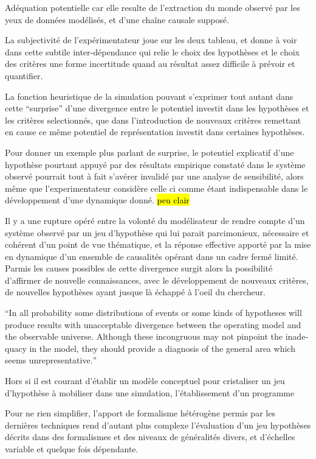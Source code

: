 Adéquation potentielle car elle resulte de l'extraction du monde observé par les yeux de données modélisés, et d'une chaîne causale supposé. 


La subjectivité de l'expérimentateur joue sur les deux tableau, et donne à voir dans cette subtile inter-dépendance qui relie le choix des hypothèses et le choix des critères une forme incertitude quand au résultat assez difficile à prévoir et quantifier.

La fonction heuristique de la simulation pouvant s'exprimer tout autant dans cette \enquote{surprise} d'une divergence entre le potentiel investit dans les hypothèses et les critères selectionnés, que dans l'introduction de nouveaux critères remettant en cause ce même potentiel de représentation investit dans certaines hypothèses.

Pour donner un exemple plus parlant de surprise, le potentiel explicatif d'une hypothèse pourtant appuyé par des résultats empirique constaté dans le système observé pourrait tout à fait s'avérer invalidé par une analyse de sensibilité, alors même que l'experimentateur considère celle ci comme étant indispensable dans le développement d'une dynamique donné. \hl{peu clair}

Il y a une rupture opéré entre la volonté du modélisateur de rendre compte d'un système observé par un jeu d'hypothèse qui lui parait parcimonieux, nécessaire et cohérent d'un point de vue thématique, et la réponse effective apporté par la mise en dynamique d'un ensemble de causalités opérant dans un cadre fermé limité. Parmis les causes possibles de cette divergence surgit alors la possibilité d'affirmer de nouvelle connaissances, avec le développement de nouveaux critères, de nouvelles hypothèses ayant jusque là échappé à l'oeil du chercheur.

\foreignquote{english}{In all probability some distributions of events or some kinds of hypotheses will produce results with unacceptable divergence between the operating model and the observable universe. Although these incongruous may not pinpoint the inadequacy in the model, they should provide a diagnosis of the general area which seems unrepresentative.}



Hors si il est courant d'établir un modèle conceptuel pour cristaliser un jeu d'hypothèse à mobiliser dans une simulation, l'établissement d'un programme 


Pour ne rien simplifier, l'apport de formalisme hétérogène permis par les dernières techniques rend d'autant plus complexe l'évaluation d'un jeu hypothèses décrits dans des formalismes et des niveaux de généralités divers, et d'échelles variable et quelque fois dépendante.


